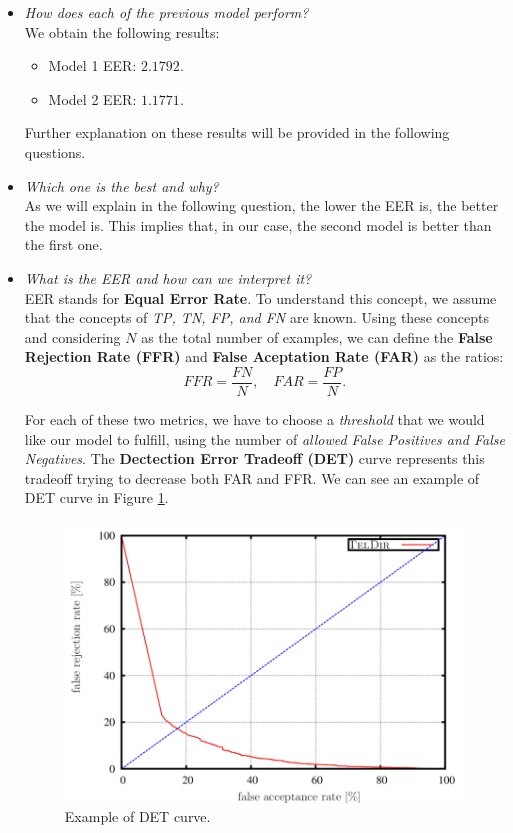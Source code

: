 \documentclass[a4paper]{article}
\begin{document}
\begin{itemize}
  \item \emph{How does each of the previous model perform?}\\

        We obtain the following results:
        \begin{itemize}
          \item Model 1 EER: \(2.1792\).
          \item Model 2 EER: \(1.1771\).
        \end{itemize}

  Further explanation on these results will be provided in the following questions.

  \item \emph{Which one is the best and why?}\\

        As we will explain in the following question, the lower the EER is, the better the model is. This implies that, in our case, the second model is better than the first one.

  \item \emph{What is the EER and how can we interpret it?}\\

        EER stands for \textbf{Equal Error Rate}. To understand this concept, we assume that the concepts of \emph{TP, TN, FP, and FN} are known. Using these concepts and considering \(N\) as the total number of examples, we can define the \textbf{False Rejection Rate (FFR)} and \textbf{False Aceptation Rate (FAR)} as the ratios:
        \[
        FFR = \frac{FN}{N}, \quad FAR = \frac{FP}{N}.
        \]

        For each of these two metrics, we have to choose a \emph{threshold} that we would like our model to fulfill, using the number of \emph{allowed False Positives and False Negatives}. The \textbf{Dectection Error Tradeoff (DET)} curve represents this tradeoff trying to decrease both FAR and FFR. We can see an example of DET curve in Figure \ref{fig:DET}.

        \begin{figure}
          \centering
          \includegraphics[scale=0.4]{Figures/DET}
          \caption{Example of DET curve.}
          \label{fig:DET}
        \end{figure}


\end{itemize}
\end{document}
